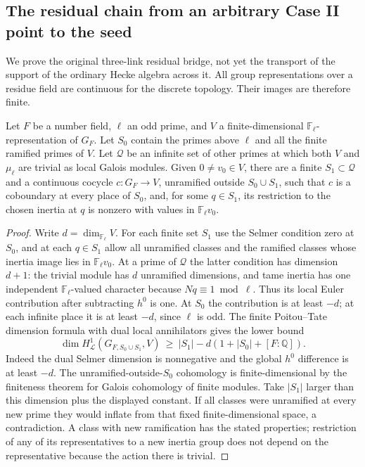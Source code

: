\subsection{The residual chain from an arbitrary Case II point to the seed}
\label{sec:rh-case-II-chain}

We prove the original three-link residual bridge, not yet the
transport of the support of the ordinary Hecke algebra across it.
All group representations over a residue field are continuous
for the discrete topology. Their images are therefore finite.

\begin{lemma}
\label{lem:rh-prescribed-ramification}
Let \(F\) be a number field, \(\ell\) an odd prime, and \(V\)
a finite-dimensional \(\mathbb F_\ell\)-representation of \(G_F\).
Let \(S_0\) contain the primes above \(\ell\) and all the finite
ramified primes of \(V\). Let \(\mathcal Q\) be an infinite set
of other primes at which both \(V\) and \(\mu_\ell\) are trivial
as local Galois modules. Given \(0\ne v_0\in V\), there are
a finite \(S_1\subset\mathcal Q\) and a continuous cocycle
\(c:G_F\to V\), unramified outside \(S_0\cup S_1\), such that
\(c\) is a coboundary at every place of \(S_0\), and, for
some \(q\in S_1\), its restriction to the chosen inertia at \(q\)
is nonzero with values in \(\mathbb F_\ell v_0\).
\end{lemma}
\begin{proof}
Write \(d=\dim_{\mathbb F_\ell}V\). For each finite set \(S_1\)
use the Selmer condition zero at \(S_0\), and at each \(q\in S_1\)
allow all unramified classes and the ramified classes whose
inertia image lies in \(\mathbb F_\ell v_0\). At a prime of
\(\mathcal Q\) the latter condition has dimension \(d+1\):
the trivial module has \(d\) unramified dimensions, and tame
inertia has one independent \(\mathbb F_\ell\)-valued character
because \(Nq\equiv1\bmod\ell\). Thus its local Euler
contribution after subtracting \(h^0\) is one.
At \(S_0\) the contribution is at least \(-d\); at each
infinite place it is at least \(-d\), since \(\ell\) is odd.
The finite Poitou--Tate dimension formula with dual local
annihilators gives the lower bound
\[
 \dim H^1_{\mathcal L}(G_{F,S_0\cup S_1},V)
 \ \ge\ |S_1|-d(1+|S_0|+[F:\mathbb Q]).
\]
Indeed the dual Selmer dimension is nonnegative and the
global \(h^0\) difference is at least \(-d\).
The unramified-outside-\(S_0\) cohomology is finite-dimensional
by the finiteness theorem for Galois cohomology of finite
modules. Take \(|S_1|\) larger than this dimension plus the
displayed constant. If all classes were unramified at every
new prime they would inflate from that fixed finite-dimensional
space, a contradiction. A class with new ramification has the
stated properties; restriction of any of its representatives
to a new inertia group does not depend on the representative
because the action there is trivial.
\end{proof}

